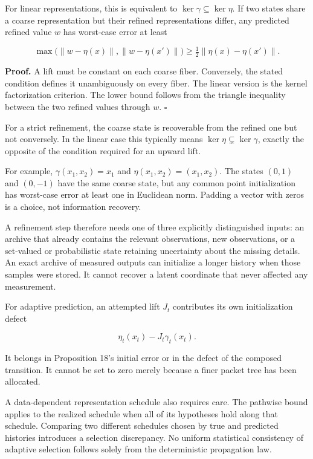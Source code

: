 For linear representations, this is equivalent to
\(\ker\gamma\subseteq\ker\eta\). If two states share a coarse
representation but their refined representations differ, any predicted
refined value \(w\) has worst-case error at least

\[
\max\bigl(\|w-\eta(x)\|,\|w-\eta(x')\|\bigr)
\geq\tfrac12\|\eta(x)-\eta(x')\|.
\]

\textbf{Proof.} A lift must be constant on each coarse fiber.
Conversely, the stated condition defines it unambiguously on every
fiber. The linear version is the kernel factorization criterion. The
lower bound follows from the triangle inequality between the two refined
values through \(w\). \(\square\)

For a strict refinement, the coarse state is recoverable from the
refined one but not conversely. In the linear case this typically means
\(\ker\eta\subsetneq\ker\gamma\), exactly the opposite of the condition
required for an upward lift.

For example, \(\gamma(x_1,x_2)=x_1\) and \(\eta(x_1,x_2)=(x_1,x_2)\).
The states \((0,1)\) and \((0,-1)\) have the same coarse state, but any
common point initialization has worst-case error at least one in
Euclidean norm. Padding a vector with zeros is a choice, not information
recovery.

A refinement step therefore needs one of three explicitly distinguished
inputs: an archive that already contains the relevant observations, new
observations, or a set-valued or probabilistic state retaining
uncertainty about the missing details. An exact archive of measured
outputs can initialize a longer history when those samples were stored.
It cannot recover a latent coordinate that never affected any
measurement.

For adaptive prediction, an attempted lift \(J_t\) contributes its own
initialization defect

\[
\eta_t(x_t)-J_t\gamma_t(x_t).
\]

It belongs in Proposition 18's initial error or in the defect of the
composed transition. It cannot be set to zero merely because a finer
packet tree has been allocated.

A data-dependent representation schedule also requires care. The
pathwise bound applies to the realized schedule when all of its
hypotheses hold along that schedule. Comparing two different schedules
chosen by true and predicted histories introduces a selection
discrepancy. No uniform statistical consistency of adaptive selection
follows solely from the deterministic propagation law.

